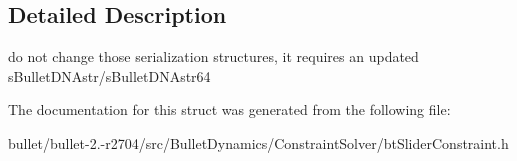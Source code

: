 \subsection{Detailed Description}
do not change those serialization structures, it requires an updated s\+Bullet\+D\+N\+Astr/s\+Bullet\+D\+N\+Astr64 

The documentation for this struct was generated from the following file\+:\begin{DoxyCompactItemize}
\item 
bullet/bullet-\/2.-\/r2704/src/\+Bullet\+Dynamics/\+Constraint\+Solver/bt\+Slider\+Constraint.\+h\end{DoxyCompactItemize}
